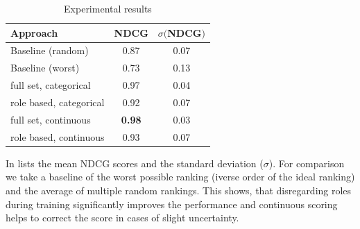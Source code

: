 \begin{table}
	\caption{Experimental results}
	\label{tab:results}
	\begin{tabular}{lcc}
		\toprule
		Approach & NDCG & $\sigma ($NDCG$)$\\
		\midrule
		Baseline (random) & 0.87 & 0.07\\
		Baseline (worst) & 0.73 & 0.13\\
		\midrule
		full set, categorical & 0.97 & 0.04 \\
		role based, categorical & 0.92 & 0.07  \\
		full set, continuous & \textbf{0.98} & 0.03 \\
		role based, continuous & 0.93 & 0.07 \\
		\bottomrule
	\end{tabular}
\end{table}

In  lists the mean NDCG scores and the standard deviation ($\sigma$). For comparison we take a baseline of the worst possible ranking (iverse order of the ideal ranking) and the average of multiple random rankings. This shows, that disregarding roles during training significantly improves the performance and continuous scoring helps to correct the score in cases of slight uncertainty.

